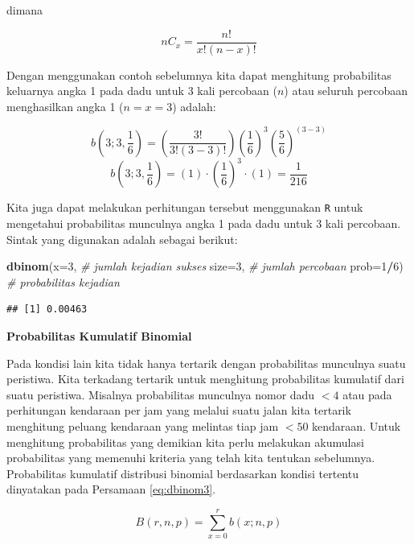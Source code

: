 \documentclass[]{book}
\newenvironment{Shaded}{\begin{snugshade}}{\end{snugshade}}
\newcommand{\KeywordTok}[1]{\textcolor[rgb]{0.13,0.29,0.53}{\textbf{#1}}}
\newcommand{\DataTypeTok}[1]{\textcolor[rgb]{0.13,0.29,0.53}{#1}}
\newcommand{\DecValTok}[1]{\textcolor[rgb]{0.00,0.00,0.81}{#1}}
\newcommand{\CommentTok}[1]{\textcolor[rgb]{0.56,0.35,0.01}{\textit{#1}}}
\newcommand{\OperatorTok}[1]{\textcolor[rgb]{0.81,0.36,0.00}{\textbf{#1}}}
\newcommand{\NormalTok}[1]{#1}
\begin{document}
dimana

\begin{equation}
   nC_x=\frac{n!}{x!\left(n-x\right)!}
  \label{eq:dbinom2}
\end{equation}

Dengan menggunakan contoh sebelumnya kita dapat menghitung probabilitas
keluarnya angka 1 pada dadu untuk 3 kali percobaan (\(n\)) atau seluruh
percobaan menghasilkan angka 1 (\(n=x=3\)) adalah:

\[
b\left(3;3,\frac{1}{6}\right)=\left(\frac{3!}{3!\left(3-3\right)!}\right)\left(\frac{1}{6}\right)^3\left(\frac{5}{6}\right)^{\left(3-3\right)}
\] \[
b\left(3;3,\frac{1}{6}\right)=\left(1\right)\cdot\left(\frac{1}{6}\right)^3\cdot\left(1\right)=\frac{1}{216}
\]

Kita juga dapat melakukan perhitungan tersebut menggunakan \texttt{R}
untuk mengetahui probabilitas munculnya angka 1 pada dadu untuk 3 kali
percobaan. Sintak yang digunakan adalah sebagai berikut:

\begin{Shaded}
\begin{Highlighting}[]
\KeywordTok{dbinom}\NormalTok{(}\DataTypeTok{x=}\DecValTok{3}\NormalTok{, }\CommentTok{# jumlah kejadian sukses }
       \DataTypeTok{size=}\DecValTok{3}\NormalTok{, }\CommentTok{# jumlah percobaan}
       \DataTypeTok{prob=}\DecValTok{1}\OperatorTok{/}\DecValTok{6}\NormalTok{) }\CommentTok{# probabilitas kejadian}
\end{Highlighting}
\end{Shaded}

\begin{verbatim}
## [1] 0.00463
\end{verbatim}

\textbf{Probabilitas Kumulatif Binomial}

Pada kondisi lain kita tidak hanya tertarik dengan probabilitas
munculnya suatu peristiwa. Kita terkadang tertarik untuk menghitung
probabilitas kumulatif dari suatu peristiwa. Misalnya probabilitas
munculnya nomor dadu \(<4\) atau pada perhitungan kendaraan per jam yang
melalui suatu jalan kita tertarik menghitung peluang kendaraan yang
melintas tiap jam \(<50\) kendaraan. Untuk menghitung probabilitas yang
demikian kita perlu melakukan akumulasi probabilitas yang memenuhi
kriteria yang telah kita tentukan sebelumnya. Probabilitas kumulatif
distribusi binomial berdasarkan kondisi tertentu dinyatakan pada
Persamaan \eqref{eq:dbinom3}.

\begin{equation}
   B\left(r,n,p\right)=\sum_{x=0}^rb\left(x;n,p\right)
  \label{eq:dbinom3}
\end{equation}
\end{document}
